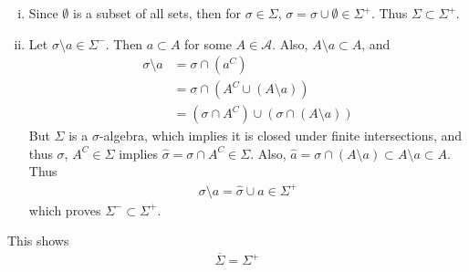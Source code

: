 \documentclass[12pt]{article}
\theoremstyle{plain}
\begin{document}
\begin{enumerate}[(i)]
    \item
        Since $\emptyset$ is a subset of all sets, then for $\sigma \in\Sigma$, $\sigma = \sigma \cup \emptyset \in \Sigma^+$.  Thus $\Sigma \subset \Sigma^+$.
    \item
        Let $\sigma \setminus a \in \Sigma^-$.  Then $a \subset A$ for some $A \in \mathcal{A}$.  Also, $A \setminus a \subset A$, and
        \begin{align*}
            \sigma \setminus a &= \sigma \cap (a^C) \\
            &= \sigma \cap (A^C \cup (A \setminus a)) \\
            &= (\sigma \cap A^C) \cup (\sigma \cap (A \setminus a))
        \end{align*}
        But $\Sigma$ is a $\sigma$-algebra, which implies it is closed under finite intersections, and thus $\sigma$, $A^C \in \Sigma$ implies $\hat{\sigma} = \sigma \cap A^C \in \Sigma$.  Also, $\hat{a} = \sigma \cap (A \setminus a) \subset A \setminus a \subset A$.  Thus
        \begin{align*}
            \sigma \setminus a = \hat{\sigma} \cup \hat{a} \in \Sigma^+
        \end{align*}
        which proves $\Sigma^- \subset \Sigma^+$.
\end{enumerate}
This shows
\begin{align*}
    \overline{\Sigma} = \Sigma^+
\end{align*}
\end{document}

